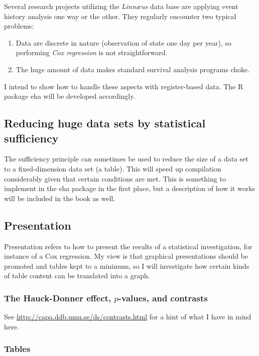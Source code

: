 \documentclass[a4paper,11pt]{article}
\begin{document}
Several research projects utilizing the \emph{Linn{\ae}us} data base are
applying event history analysis one way or the other. They regularly
encounter two typical problems:

\begin{enumerate}

\item Data are discrete in nature (observation of state one day per year),
  so performing \emph{Cox regression} is not straightforward.
\item The huge amount of data makes standard survival analysis programs
  choke.
\end{enumerate}  

I intend to show how to handle these aspects with register-based data. The
R package eha \citep{eha} will be developed accordingly.

\subsection{Reducing huge data sets by statistical sufficiency}

The sufficiency principle can sometimes be used to reduce the size of a data set 
to a fixed-dimension data set (a table). This will speed up compilation considerably
given that certain conditions are met. This is something to implement in the eha
package in the first place, but a description of how it works will be included 
in the book as well.
\subsection{Presentation}

Presentation refers to how to present the results of a statistical
investigation, for instance of a Cox regression. My view is that graphical
presentations should be promoted and tables kept to a minimum, so I will
investigate how certain kinds of table content can be translated into a graph.

\subsubsection{The Hauck-Donner effect, $p$-values, and contrasts}

See \url{http://capa.ddb.umu.se/ds/contrasts.html} for a hint of what I have in 
mind here.

\subsubsection{Tables}
\end{document}
